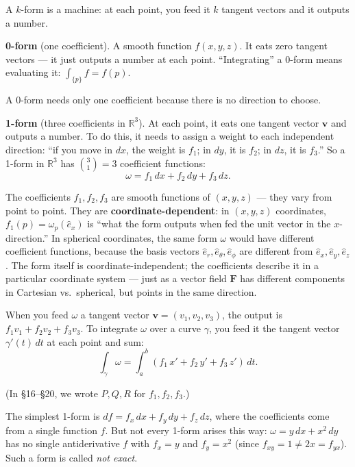\documentclass[11pt]{report}
\newcommand{\R}{\mathbb{R}}
\begin{document}
A $k$-form is a machine: at each point, you feed it $k$ tangent vectors and it outputs a number.

\textbf{0-form} (one coefficient). A smooth function $f(x,y,z)$. It eats zero tangent vectors --- it just outputs a number at each point. ``Integrating'' a 0-form means evaluating it: $\int_{\{p\}} f = f(p)$.

A 0-form needs only one coefficient because there is no direction to choose.

\textbf{1-form} (three coefficients in $\R^3$). At each point, it eats one tangent vector $\mathbf{v}$ and outputs a number. To do this, it needs to assign a weight to each independent direction: ``if you move in $dx$, the weight is $f_1$; in $dy$, it is $f_2$; in $dz$, it is $f_3$.'' So a 1-form in $\R^3$ has $\binom{3}{1} = 3$ coefficient functions:
\[
\omega = f_1\,dx + f_2\,dy + f_3\,dz.
\]

The coefficients $f_1, f_2, f_3$ are smooth functions of $(x,y,z)$ --- they vary from point to point. They are \textbf{coordinate-dependent}: in $(x,y,z)$ coordinates, $f_1(p) = \omega_p(\hat{e}_x)$ is ``what the form outputs when fed the unit vector in the $x$-direction.'' In spherical coordinates, the same form $\omega$ would have different coefficient functions, because the basis vectors $\hat{e}_r, \hat{e}_\theta, \hat{e}_\phi$ are different from $\hat{e}_x, \hat{e}_y, \hat{e}_z$. The form itself is coordinate-independent; the coefficients describe it in a particular coordinate system --- just as a vector field $\mathbf{F}$ has different components in Cartesian vs.\ spherical, but points in the same direction.

When you feed $\omega$ a tangent vector $\mathbf{v} = (v_1, v_2, v_3)$, the output is $f_1 v_1 + f_2 v_2 + f_3 v_3$. To integrate $\omega$ over a curve $\gamma$, you feed it the tangent vector $\gamma'(t)\,dt$ at each point and sum:
\[
\int_\gamma \omega = \int_a^b (f_1\, x' + f_2\, y' + f_3\, z')\,dt.
\]

(In \S16--\S20, we wrote $P, Q, R$ for $f_1, f_2, f_3$.)

The simplest 1-form is $df = f_x\,dx + f_y\,dy + f_z\,dz$, where the coefficients come from a single function $f$. But not every 1-form arises this way: $\omega = y\,dx + x^2\,dy$ has no single antiderivative $f$ with $f_x = y$ and $f_y = x^2$ (since $f_{xy} = 1 \neq 2x = f_{yx}$). Such a form is called \textit{not exact}.
\end{document}
